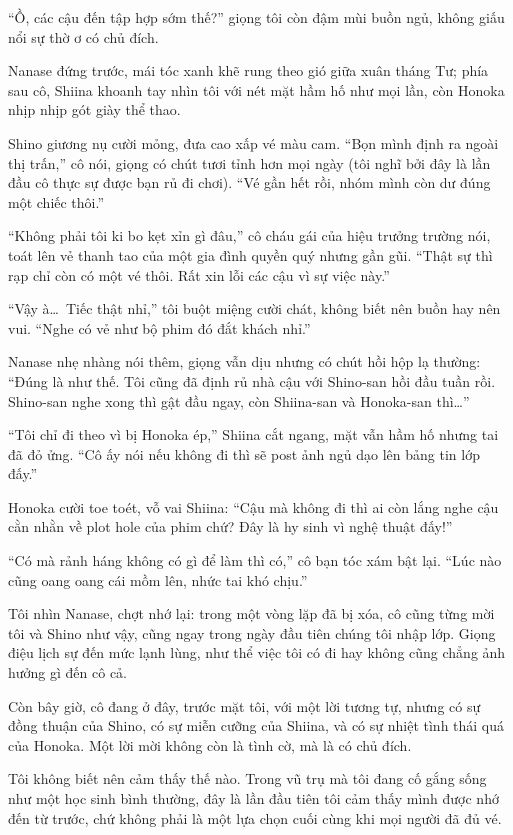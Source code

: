 \documentclass[../main.tex]{subfiles}
\begin{document}
``Ồ, các cậu đến tập hợp sớm thế?'' giọng tôi còn đậm mùi buồn ngủ, không giấu nổi sự thờ ơ có chủ đích.

Nanase đứng trước, mái tóc xanh khẽ rung theo gió giữa xuân tháng Tư; phía sau cô, Shiina khoanh tay nhìn tôi với nét mặt hầm hố như mọi lần, còn Honoka nhịp nhịp gót giày thể thao.

Shino giương nụ cười mỏng, đưa cao xấp vé màu cam.  ``Bọn mình định ra ngoài thị trấn,'' cô nói, giọng có chút tươi tỉnh hơn mọi ngày (tôi nghĩ bởi đây là lần đầu cô thực sự được bạn rủ đi chơi). ``Vé gần hết rồi, nhóm mình còn dư đúng một chiếc thôi.''

``Không phải tôi ki bo kẹt xỉn gì đâu,'' cô cháu gái của hiệu trưởng trường nói, toát lên vẻ thanh tao của một gia đình quyền quý nhưng gần gũi. ``Thật sự thì rạp chỉ còn có một vé thôi. Rất xin lỗi các cậu vì sự việc này.''

``Vậy à\dots\ Tiếc thật nhỉ,'' tôi buột miệng cười chát, không biết nên buồn hay nên vui. ``Nghe có vẻ như bộ phim đó đắt khách nhỉ.''

Nanase nhẹ nhàng nói thêm, giọng vẫn dịu nhưng có chút hồi hộp lạ thường: ``Đúng là như thế. Tôi cũng đã định rủ nhà cậu với Shino-san hồi đầu tuần rồi. Shino-san nghe xong thì gật đầu ngay, còn Shiina-san và Honoka-san thì\dots''

``Tôi chỉ đi theo vì bị Honoka ép,'' Shiina cắt ngang, mặt vẫn hầm hố nhưng tai đã đỏ ửng. ``Cô ấy nói nếu không đi thì sẽ post ảnh ngủ dạo lên bảng tin lớp đấy.''

Honoka cười toe toét, vỗ vai Shiina: ``Cậu mà không đi thì ai còn lắng nghe cậu cằn nhằn về plot hole của phim chứ? Đây là hy sinh vì nghệ thuật đấy!''

``Có mà rảnh háng không có gì để làm thì có,'' cô bạn tóc xám bật lại. ``Lúc nào cũng oang oang cái mồm lên, nhức tai khó chịu.''

Tôi nhìn Nanase, chợt nhớ lại: trong một vòng lặp đã bị xóa, cô cũng từng mời tôi và Shino như vậy, cũng ngay trong ngày đầu tiên chúng tôi nhập lớp. Giọng điệu lịch sự đến mức lạnh lùng, như thể việc tôi có đi hay không cũng chẳng ảnh hưởng gì đến cô cả.

Còn bây giờ, cô đang ở đây, trước mặt tôi, với một lời tương tự, nhưng có sự đồng thuận của Shino, có sự miễn cưỡng của Shiina, và có sự nhiệt tình thái quá của Honoka. Một lời mời không còn là tình cờ, mà là có chủ đích.

Tôi không biết nên cảm thấy thế nào. Trong vũ trụ mà tôi đang cố gắng sống như một học sinh bình thường, đây là lần đầu tiên tôi cảm thấy mình được nhớ đến từ trước, chứ không phải là một lựa chọn cuối cùng khi mọi người đã đủ vé.
\end{document}
